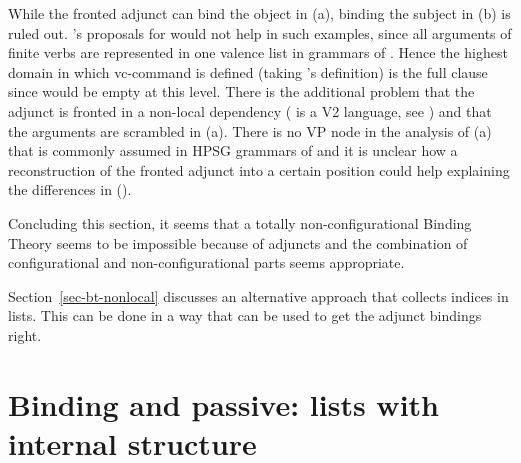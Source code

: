 \documentclass[output=paper
 	        ,biblatex
                ,babelshorthands
                ,newtxmath
                ,draftmode
                ,colorlinks, citecolor=brown
]{langscibook}
\begin{document}
While the fronted adjunct can bind the object in (a), binding the subject in (b) is
ruled out. \citeauthor{Walker2011a}'s proposals for  would not help in such examples, since all arguments of
finite verbs are represented in one valence list in grammars of . Hence the highest domain in
which vc-command is defined (taking \citeauthor{HL95b}'s definition) is the full clause since \comps
would be empty at this level. There is the additional problem that the adjunct is fronted in a
non-local dependency ( is a V2 language, see \cites[Chapter~2.4]{Erdmann1886a}[, ]{Paul1919a}[Section~3]{MuellerGermanHandbook}) and that the arguments are scrambled in
(a). There is no VP node in the analysis of (a) that is commonly assumed in HPSG
grammars of  and it is unclear how a reconstruction of the fronted adjunct into a certain
position could help explaining the differences in ().




Concluding this section, it seems that a totally non-configurational Binding Theory seems to be
impossible because of adjuncts and the combination of configurational and non-configurational parts
seems appropriate. 

Section~\ref{sec-bt-nonlocal} discusses an alternative approach that collects indices in lists. This can be done in a
way that can be used to get the adjunct bindings right.
 





\section{Binding and passive: \texorpdfstring{\argst}{ARG-ST} lists with internal structure}
\label{binding-sec-passive}

\end{document}
